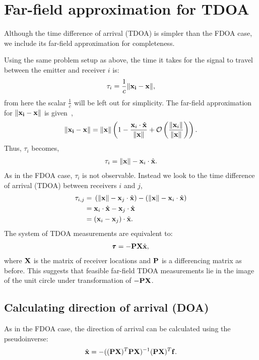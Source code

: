 \section{Far-field approximation for TDOA}
Although the time difference of arrival (TDOA) is simpler than the FDOA case, we include its far-field approximation for completeness.

Using the same problem setup as above, the time it takes for the signal to travel between the emitter and receiver $i$ is:
\begin{align*}
  \tau_{i} = \frac{1}{c}\|\mathbf{x_i}-\mathbf{x}\|,
\end{align*}
from here the scalar $\frac{1}{c}$ will be left out for simplicity.
The far-field approximation for $\|\mathbf{x_i}-\mathbf{x}\|$ is given~\cite{Cheney2009},
\begin{align*}
  \|\mathbf{x_i}-\mathbf{x}\|=\|\mathbf{x}\|\left(1-\frac{\mathbf{x}_i\cdot\hat{\mathbf{x}}}{\|\mathbf{x}\|}+\mathcal{O}\left( \frac{\|\mathbf{x}_i\|}{\|\mathbf{x}\|}\right) \right).
\end{align*}
Thus, $\tau_{i}$ becomes,
\begin{align*}
  \tau_{i} = \|\mathbf{x}\| - \mathbf{x}_i\cdot\hat{\mathbf{x}}.
\end{align*}
As in the FDOA case, $\tau_i$ is not observable. Instead we look to the time difference of arrival (TDOA) between receivers $i$ and $j$,
\begin{align*}
  \tau_{i,j} =& \; \left(\|\mathbf{x}\| - \mathbf{x}_j\cdot\hat{\mathbf{x}}\right) - \left(\|\mathbf{x}\| - \mathbf{x}_i\cdot\hat{\mathbf{x}}\right) \\
            =& \; \mathbf{x}_i\cdot\hat{\mathbf{x}} - \mathbf{x}_j\cdot\hat{\mathbf{x}} \\
            =& \; (\mathbf{x}_i-\mathbf{x}_j)\cdot\hat{\mathbf{x}}.
\end{align*}
The system of TDOA measurements are equivalent to:
\begin{align}
  \pmb{\tau} = -\mathbf{PX}\hat{\mathbf{x}},
\end{align}
where $\mathbf{X}$ is the matrix of receiver locations and $\mathbf{P}$ is a differencing matrix as before. This suggests that feasible far-field TDOA measurements lie in the image of the unit circle under transformation of $-\mathbf{PX}$.

\subsection{Calculating direction of arrival (DOA)}
As in the FDOA case, the direction of arrival can be calculated using the pseudoinverse:
\begin{align}
    \label{eq:doa_t}
  \hat{\mathbf{x}} = -((\mathbf{PX})^T\mathbf{PX})^{-1}(\mathbf{PX})^T\mathbf{f}.
\end{align}
